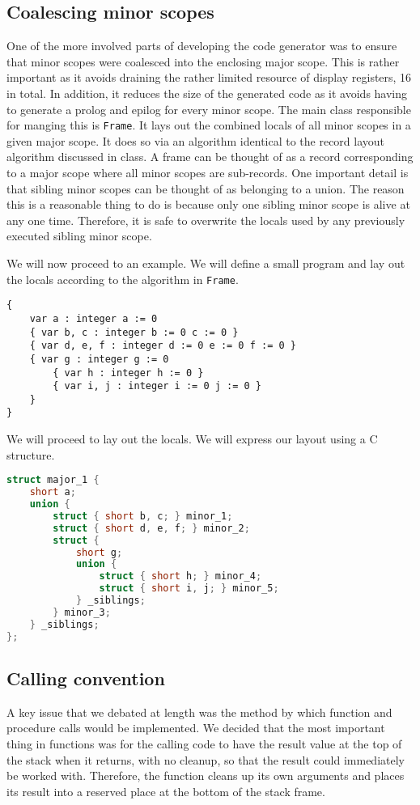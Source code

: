 \documentclass[oneside]{amsart}
\theoremstyle{definition}
\theoremstyle{remark}
\numberwithin{equation}{section}
\begin{document}
\subsection{Coalescing minor scopes}
One of the more involved parts of developing the code generator was to ensure that minor scopes were
coalesced into the enclosing major scope. This is rather important as it avoids draining the rather
limited resource of display registers, 16 in total. In addition, it reduces the size of the
generated code as it avoids having to generate a prolog and epilog for every minor scope. The main
class responsible for manging this is \texttt{Frame}. It lays out the combined locals of all minor
scopes in a given major scope. It does so via an algorithm identical to the record layout algorithm
discussed in class. A frame can be thought of as a record corresponding to a major scope where all
minor scopes are sub-records. One important detail is that sibling minor scopes can be thought of as
belonging to a union. The reason this is a reasonable thing to do is because only one sibling minor
scope is alive at any one time. Therefore, it is safe to overwrite the locals used by any previously
executed sibling minor scope.

We will now proceed to an example. We will define a small program and lay out the locals according
to the algorithm in \texttt{Frame}.
\begin{lstlisting}[caption=Major scope in 488]
{
    var a : integer a := 0
    { var b, c : integer b := 0 c := 0 }
    { var d, e, f : integer d := 0 e := 0 f := 0 }
    { var g : integer g := 0
        { var h : integer h := 0 }
        { var i, j : integer i := 0 j := 0 }
    } 
}
\end{lstlisting}

\newpage

\noindent We will proceed to lay out the locals. We will express our layout using a C structure.
\begin{lstlisting}[caption=Layout as C structure, language=C, directivestyle={\color{black}} emph={short}, emphstyle={\color{blue}}]
struct major_1 {
    short a;
    union {
        struct { short b, c; } minor_1;
        struct { short d, e, f; } minor_2;
        struct {
            short g;
            union {
                struct { short h; } minor_4;
                struct { short i, j; } minor_5;
            } _siblings;
        } minor_3;
    } _siblings;
};
\end{lstlisting}

\subsection{Calling convention}
A key issue that we debated at length was the method by which function and procedure calls would be
implemented. We decided that the most important thing in functions was for the calling code  to have
the result value at the top of the stack when it returns, with no cleanup, so that the result could
immediately be worked with. Therefore, the function cleans up its own arguments and places its
result into a reserved place at the bottom of the stack frame.
\end{document}
